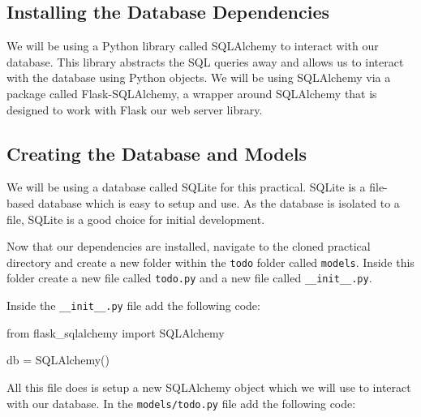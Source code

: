 \documentclass{csse4400}
\begin{document}

\subsection{Installing the Database Dependencies}

We will be using a Python library called SQLAlchemy to interact with our database.
This library abstracts the SQL queries away and allows us to interact with the database using Python objects.
We will be using SQLAlchemy via a package called Flask-SQLAlchemy,
a wrapper around SQLAlchemy that is designed to work with Flask our web server library.


\subsection{Creating the Database and Models}

We will be using a database called SQLite for this practical.
SQLite is a file-based database which is easy to setup and use.
As the database is isolated to a file, SQLite is a good choice for initial development.

Now that our dependencies are installed,
navigate to the cloned practical directory and create a new folder within the \texttt{todo} folder called \texttt{models}.
Inside this folder create a new file called \texttt{todo.py} and a new file called \texttt{\_\_init\_\_.py}.

Inside the \texttt{\_\_init\_\_.py} file add the following code:

\begin{code}[language=python,numbers=none]{}
  from flask_sqlalchemy import SQLAlchemy

  db = SQLAlchemy()
\end{code}

All this file does is setup a new SQLAlchemy object which we will use to interact with our database.
In the \texttt{models/todo.py} file add the following code:
\end{document}
